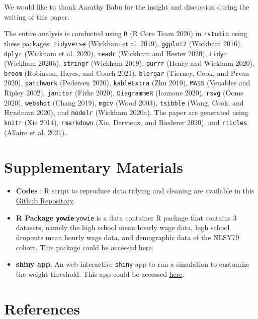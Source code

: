 \documentclass{article}
\begin{document}
We would like to thank Aarathy Babu for the insight and discussion during the writing of this paper.

The entire analysis is conducted using \texttt{R} (R Core Team 2020) in \texttt{rstudio} using these packages: \texttt{tidyverse} (Wickham et al. 2019), \texttt{ggplot2} (Wickham 2016), \texttt{dplyr} (Wickham et al. 2020), \texttt{readr} (Wickham and Hester 2020), \texttt{tidyr} (Wickham 2020b), \texttt{stringr} (Wickham 2019), \texttt{purrr} (Henry and Wickham 2020), \texttt{broom} (Robinson, Hayes, and Couch 2021), \texttt{blorgar} (Tierney, Cook, and Prvan 2020), \texttt{patchwork} (Pedersen 2020), \texttt{kableExtra} (Zhu 2019), \texttt{MASS} (Venables and Ripley 2002), \texttt{janitor} (Firke 2020), \texttt{DiagrammeR} (Iannone 2020), \texttt{rsvg} (Ooms 2020), \texttt{webshot} (Chang 2019), \texttt{mgcv} (Wood 2003), \texttt{tsibble} (Wang, Cook, and Hyndman 2020), and \texttt{modelr} (Wickham 2020a). The paper are generated using \texttt{knitr} (Xie 2014), \texttt{rmarkdown} (Xie, Dervieux, and Riederer 2020), and \texttt{rticles} (Allaire et al. 2021).

\hypertarget{supplementary-materials}{%
\section{Supplementary Materials}\label{supplementary-materials}}

\begin{itemize}
\item
  \textbf{Codes} : R script to reproduce data tidying and cleaning are available in this \href{https://github.com/numbats/yowie/blob/master/data-raw/data_preprocessing.R}{Github Repository}.
\item
  \textbf{R Package \texttt{yowie}}:\texttt{yowie} is a data container R package that contains 3 datasets, namely the high school mean hourly wage data, high school dropouts mean hourly wage data, and demographic data of the NLSY79 cohort. This package could be accessed \href{https://github.com/numbats/yowie}{here}.
\item
  \textbf{shiny app}: An web interactive \texttt{shiny} app to run a simulation to customize the weight threshold. This app could be accessed \href{https://github.com/numbats/summer-wages-refresh/tree/main/app}{here}.
\end{itemize}

\hypertarget{references}{%
\section*{References}\label{references}}
\end{document}
